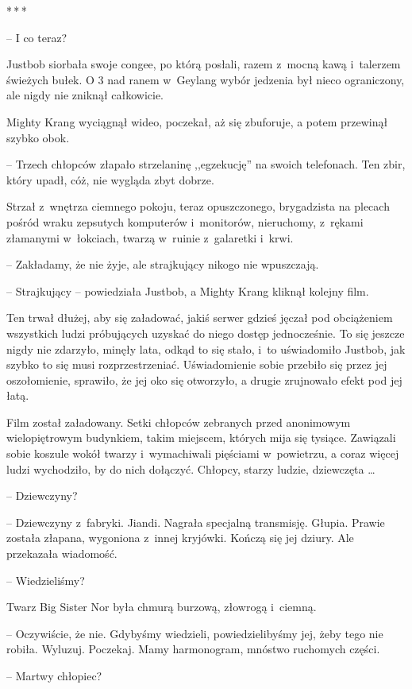 \documentclass[oneside,polish,11pt,rmheadings]{mwbk}
\newcommand{\threeast}{\par\centerline{*\,*\,*}\medskip\par}
\begin{document}
\bigskip
\threeast

-- I co teraz? 

 Justbob siorbała swoje congee, po którą posłali, razem z~mocną kawą i~talerzem świeżych bułek. O 3 nad ranem w~Geylang wybór jedzenia był nieco ograniczony, ale nigdy nie zniknął całkowicie.

Mighty Krang wyciągnął wideo, poczekał, aż się zbuforuje, a potem przewinął szybko obok. 

-- Trzech chłopców złapało strzelaninę ,,egzekucję'' na swoich telefonach. Ten zbir, który upadł, cóż, nie wygląda zbyt dobrze. 

Strzał z~wnętrza ciemnego pokoju, teraz opuszczonego, brygadzista na plecach pośród wraku zepsutych komputerów i~monitorów, nieruchomy, z~rękami złamanymi w~łokciach, twarzą w~ruinie z~galaretki i~krwi.

-- Zakładamy, że nie żyje, ale strajkujący nikogo nie wpuszczają.

-- Strajkujący -- powiedziała Justbob, a Mighty Krang kliknął kolejny film. 

Ten trwał dłużej, aby się załadować, jakiś serwer gdzieś jęczał pod obciążeniem wszystkich ludzi próbujących uzyskać do niego dostęp jednocześnie. To się jeszcze nigdy nie zdarzyło, minęły lata, odkąd to się stało, i~to uświadomiło Justbob, jak szybko to się musi rozprzestrzeniać. Uświadomienie sobie przebiło się przez jej oszołomienie, sprawiło, że jej oko się otworzyło, a drugie zrujnowało efekt pod jej łatą.

Film został załadowany. Setki chłopców zebranych przed anonimowym wielopiętrowym budynkiem, takim miejscem, których mija się tysiące. Zawiązali sobie koszule wokół twarzy i~wymachiwali pięściami w~powietrzu, a coraz więcej ludzi wychodziło, by do nich dołączyć. Chłopcy, starzy ludzie, dziewczęta \ldots 

-- Dziewczyny? 

-- Dziewczyny z~fabryki. Jiandi. Nagrała specjalną transmisję. Głupia. Prawie została złapana, wygoniona z~innej kryjówki. Kończą się jej dziury. Ale przekazała wiadomość. 

-- Wiedzieliśmy?

Twarz Big Sister Nor była chmurą burzową, złowrogą i~ciemną. 

-- Oczywiście, że nie. Gdybyśmy wiedzieli, powiedzielibyśmy jej, żeby tego nie robiła. Wyluzuj. Poczekaj. Mamy harmonogram, mnóstwo ruchomych części.

-- Martwy chłopiec?
\end{document}
